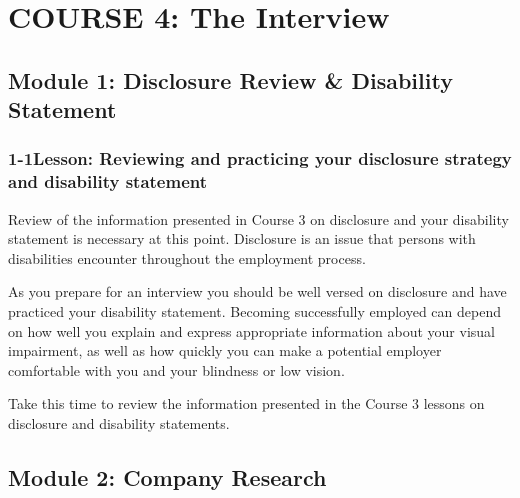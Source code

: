 \hypertarget{course4}{}\chapter*{COURSE 4: The Interview}\label{course4}
\noindent\makebox[\linewidth]{\rule{\linewidth}{0.4pt}}
\localtableofcontents
\noindent\makebox[\textwidth]{\rule{\linewidth}{0.4pt}}
\newpage

\pagebreak \section*{Module 1: Disclosure Review \& Disability Statement}
\noindent\makebox[\textwidth]{\rule{\linewidth}{0.4pt}} 
\localtableofcontents
\noindent\makebox[\textwidth]{\rule{\linewidth}{0.4pt}}
\leftskip=0.5cm
\pagebreak \subsection*{1-1\quad Lesson: Reviewing and practicing your disclosure strategy and disability statement}
Review of the information presented in Course 3 on disclosure and your disability statement is necessary at this point. Disclosure is an issue that persons with disabilities encounter throughout the employment process.

As you prepare for an interview you should be well versed on disclosure and have practiced your disability statement. Becoming successfully employed can depend on how well you explain and express appropriate information about your visual impairment, as well as how quickly you can make a potential employer comfortable with you and your blindness or low vision.

Take this time to review the information presented in the Course 3 lessons on disclosure and disability statements.

\pagebreak \section*{Module 2:	Company Research}
\noindent\makebox[\textwidth]{\rule{\linewidth}{0.4pt}}  \localtableofcontents
\noindent\makebox[\textwidth]{\rule{\linewidth}{0.4pt}}


